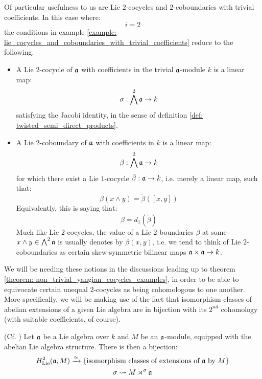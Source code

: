         \begin{example} \label{example: low_degree_lie_cocycles_and_coboundaries_with_trivial_coefficients}
            Of particular usefulness to us are Lie $2$-cocycles and $2$-coboundaries with trivial coefficients. In this case where:
                $$i = 2$$
            the conditions in example \ref{example: lie_cocycles_and_coboundaries_with_trivial_coefficients} reduce to the following.
            \begin{itemize}
                \item A Lie $2$-cocycle of $\mathfrak{a}$ with coefficients in the trivial $\mathfrak{a}$-module $k$ is a linear map:
                    $$\sigma: \bigwedge^2 \mathfrak{a} \to k$$
                satisfying the Jacobi identity, in the sense of definition \ref{def: twisted_semi_direct_products}.
                \item A Lie $2$-coboundary of $\mathfrak{a}$ with coefficients in $k$ is a linear map:
                    $$\beta: \bigwedge^2 \mathfrak{a} \to k$$
                for which there exist a Lie $1$-cocycle $\tilde{\beta}: \mathfrak{a} \to k$, i.e. merely a linear map, such that:
                    $$\beta(x \wedge y) = \tilde{\beta}([x, y])$$
                Equivalently, this is saying that:
                    $$\beta = d_1(\tilde{\beta})$$
                Much like Lie $2$-cocycles, the value of a Lie $2$-boundaries $\beta$ at some $x \wedge y \in \bigwedge^2 \mathfrak{a}$ is usually denotes by $\beta(x, y)$, i.e. we tend to think of Lie $2$-coboundaries as certain skew-symmetric bilinear maps $\a \x \a \to k$.
            \end{itemize}
        \end{example}

        We will be needing these notions in the discussions leading up to theorem \ref{theorem: non_trivial_yangian_cocycles_examples}, in order to be able to equivocate certain unequal $2$-cocycles as being cohomologous to one another. More specifically, we will be making use of the fact that isomorphism classes of abelian extensions of a given Lie algebra are in bijection with its $2^{nd}$ cohomology (with suitable coefficients, of course).
        \begin{theorem} \label{theorem: classification_of_abelian_lie_algebra_extensions}
            (Cf. \cite[Theorem VII.3.3]{hilton_stammbach_homological_algebra}) Let $\mathfrak{a}$ be a Lie algebra over $k$ and $M$ be an $\mathfrak{a}$-module, equipped with the abelian Lie algebra structure. There is then a bijection:
                $$H^2_{\mathrm{Lie}}(\mathfrak{a}, M) \xrightarrow[]{\simeq} \{ \text{isomorphism classes of extensions of $\mathfrak{a}$ by $M$} \}$$
                $$\sigma \leadsto M \rtimes^{\sigma} \mathfrak{a}$$
        \end{theorem}
        
